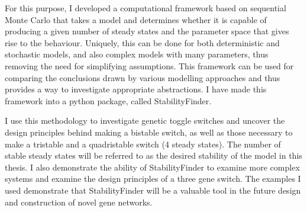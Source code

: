 For this purpose, I developed a computational framework based on sequential Monte Carlo that takes a model and determines whether it is capable of producing a given number of steady states and the parameter space that gives rise to the behaviour. Uniquely, this can be done for both deterministic and stochastic models, and also complex models with many parameters, thus removing the need for simplifying assumptions. This framework can be used for comparing the conclusions drawn by various modelling approaches and thus provides a way to investigate appropriate abstractions. I have made this framework into a python package, called StabilityFinder. 

I use this methodology to investigate genetic toggle switches and uncover the design principles behind making a bistable switch, as well as those necessary to make a tristable and a quadristable switch (4 steady states). The number of stable steady states will be referred to as the desired stability of the model in this thesis. I also demonstrate the ability of StabilityFinder to examine more complex systems and examine the design principles of a three gene switch. The examples I used demonstrate that StabilityFinder will be a valuable tool in the future design and construction of novel gene networks. 




